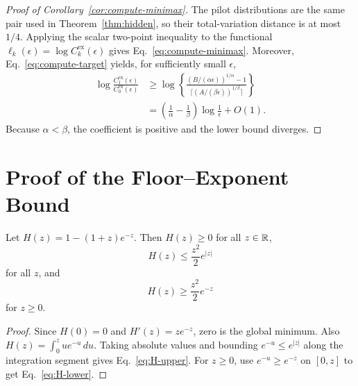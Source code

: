 \begin{proof}[Proof of Corollary~\ref{cor:compute-minimax}]
The pilot distributions are the same pair used in Theorem~\ref{thm:hidden}, so their total-variation distance is at most $1/4$. Applying the scalar two-point inequality to the functional
$\ell_k(\epsilon)=\log C_k^{\mathrm{ex}}(\epsilon)$ gives Eq.~\eqref{eq:compute-minimax}.
Moreover, Eq.~\eqref{eq:compute-target} yields, for sufficiently small $\epsilon$,
\begin{align*}
 \log\frac{C_1^{\mathrm{ex}}(\epsilon)}
 {C_0^{\mathrm{ex}}(\epsilon)}
 &\ge \log\left\{
 \frac{(B/(\alpha\epsilon))^{1/\alpha}-1}
 {\lceil(A/(\beta\epsilon))^{1/\beta}\rceil}
 \right\}\\
 &=\left(\frac1\alpha-\frac1\beta\right)\log\frac1\epsilon+O(1).
\end{align*}
Because $\alpha<\beta$, the coefficient is positive and the lower bound diverges.
\end{proof}

\section{Proof of the Floor--Exponent Bound}

\begin{lemma}
\label{lem:H}
Let $H(z)=1-(1+z)e^{-z}$. Then $H(z)\ge0$ for all $z\in\mathbb{R}$,
\begin{equation}
 H(z)\le\frac{z^2}{2}e^{|z|}
 \label{eq:H-upper}
\end{equation}
for all $z$, and
\begin{equation}
 H(z)\ge\frac{z^2}{2}e^{-z}
 \label{eq:H-lower}
\end{equation}
for $z\ge0$.
\end{lemma}

\begin{proof}
Since $H(0)=0$ and $H'(z)=ze^{-z}$, zero is the global minimum. Also
$H(z)=\int_0^z ue^{-u}\,du$. Taking absolute values and bounding
$e^{-u}\le e^{|z|}$ along the integration segment gives Eq.~\eqref{eq:H-upper}. For $z\ge0$, use $e^{-u}\ge e^{-z}$ on $[0,z]$ to get Eq.~\eqref{eq:H-lower}.
\end{proof}

